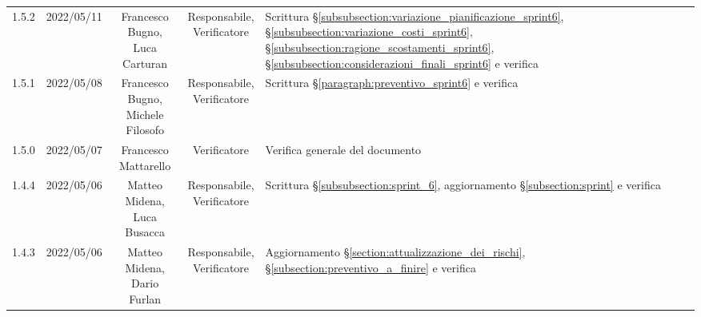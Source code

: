 \begin{center}
\begin{longtable}[c]{c | c | c | c | p{5cm}}
		1.5.2                                                      & 2022/05/11 & \Shortunderstack{Francesco Bugno,                                                                                                                                                                   \\Luca Carturan} & \Shortunderstack{Responsabile,\\Verificatore} & Scrittura §\ref{subsubsection:variazione_pianificazione_sprint6}, §\ref{subsubsection:variazione_costi_sprint6}, §\ref{subsubsection:ragione_scostamenti_sprint6}, §\ref{subsubsection:considerazioni_finali_sprint6} e verifica\\
		1.5.1                                                      & 2022/05/08 & \Shortunderstack{Francesco Bugno,                                                                                                                                                                   \\Michele Filosofo} & \Shortunderstack{Responsabile,\\Verificatore} & Scrittura §\ref{paragraph:preventivo_sprint6} e verifica\\
		1.5.0                                                      & 2022/05/07 & Francesco Mattarello                   & Verificatore   & Verifica generale del documento                                                                                                           \\
		1.4.4                                                      & 2022/05/06 & \Shortunderstack{Matteo Midena,                                                                                                                                                                     \\Luca Busacca} & \Shortunderstack{Responsabile,\\Verificatore} & Scrittura §\ref{subsubsection:sprint_6}, aggiornamento §\ref{subsection:sprint} e verifica\\
		1.4.3                                                      & 2022/05/06 & \Shortunderstack{Matteo Midena,                                                                                                                                                                     \\Dario Furlan} & \Shortunderstack{Responsabile,\\Verificatore} & Aggiornamento §\ref{section:attualizzazione_dei_rischi}, §\ref{subsection:preventivo_a_finire} e verifica\\

\end{longtable}
\end{center}

